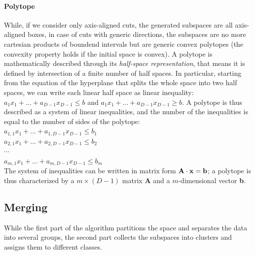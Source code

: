 \documentclass[a4paper]{article}
\begin{document}
\paragraph{Polytope}
While, if we consider only axis-aligned cuts, the generated subspaces are all axis-aligned boxes, in case of cuts with generic directions, the subspaces are no more cartesian products of boundend intervals but are generic convex polytopes (the convexity property holds if the initial space is convex).
A polytope is mathematically described through its \emph{half-space representation}, that means it is defined by intersection of a finite number of half spaces.
In particular, starting from the equation of the hyperplane that splits the whole space into two half spaces, we can write each linear half space as linear inequality: $a_1 x_1 + ... + a_{D-1} x_{D-1} \leq b$ and $a_1 x_1 + ... + a_{D-1} x_{D-1} \geq b$.
A polytope is thus described as a system of linear inequalities, and the number of the inequalities is equal to the number of sides of the polytope:\\
$a_{1,1} x_1 + ... + a_{1,D-1} x_{D-1} \leq b_1$\\
$a_{2,1} x_1 + ... + a_{2,D-1} x_{D-1} \leq b_2$\\
     $\cdots$  \\
$a_{m,1} x_1 + ... + a_{m,D-1} x_{D-1} \leq b_m$\\
The system of inequalities can be written in matrix form $\bf{A} \cdot \bf{x} = \bf{b}$;
a polytope is thus characterized by a $m \times (D-1)$ matrix \textbf{A} and a $m$-dimensional vector \textbf{b}.



\subsection{Merging}

While the first part of the algorithm partitions the space and separates the data into several groups, the second part collects the subspaces into clusters and assigns them to different classes.

\end{document}
